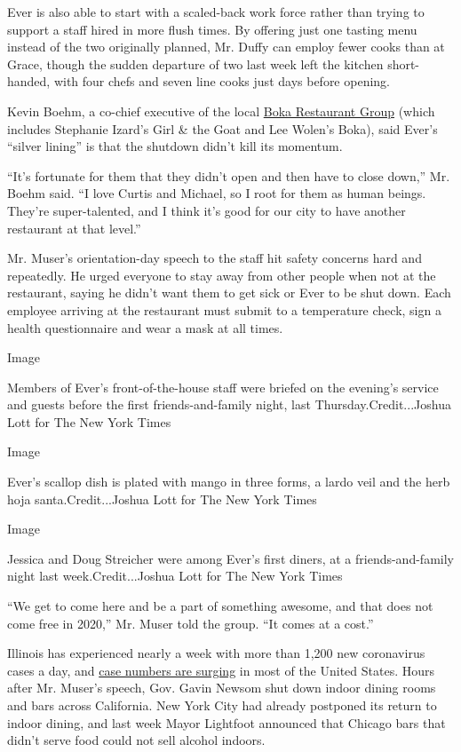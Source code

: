 Ever is also able to start with a scaled-back work force rather than
trying to support a staff hired in more flush times. By offering just
one tasting menu instead of the two originally planned, Mr. Duffy can
employ fewer cooks than at Grace, though the sudden departure of two
last week left the kitchen short-handed, with four chefs and seven line
cooks just days before opening.

Kevin Boehm, a co-chief executive of the local
\href{https://www.bokagrp.com/}{Boka Restaurant Group} (which includes
Stephanie Izard's Girl \& the Goat and Lee Wolen's Boka), said Ever's
``silver lining'' is that the shutdown didn't kill its momentum.

``It's fortunate for them that they didn't open and then have to close
down,'' Mr. Boehm said. ``I love Curtis and Michael, so I root for them
as human beings. They're super-talented, and I think it's good for our
city to have another restaurant at that level.''

Mr. Muser's orientation-day speech to the staff hit safety concerns hard
and repeatedly. He urged everyone to stay away from other people when
not at the restaurant, saying he didn't want them to get sick or Ever to
be shut down. Each employee arriving at the restaurant must submit to a
temperature check, sign a health questionnaire and wear a mask at all
times.

Image

Members of Ever's front-of-the-house staff were briefed on the evening's
service and guests before the first friends-and-family night, last
Thursday.Credit...Joshua Lott for The New York Times

Image

Ever's scallop dish is plated with mango in three forms, a lardo veil
and the herb hoja santa.Credit...Joshua Lott for The New York Times

Image

Jessica and Doug Streicher were among Ever's first diners, at a
friends-and-family night last week.Credit...Joshua Lott for The New York
Times

``We get to come here and be a part of something awesome, and that does
not come free in 2020,'' Mr. Muser told the group. ``It comes at a
cost.''

Illinois has experienced nearly a week with more than 1,200 new
coronavirus cases a day, and
\href{https://slack-redir.net/link?url=https\%3A\%2F\%2Fwww.nytimes.com\%2Finteractive\%2F2020\%2Fus\%2Fcoronavirus-us-cases.html\%23states}{case
numbers are surging} in most of the United States. Hours after Mr.
Muser's speech, Gov. Gavin Newsom shut down indoor dining rooms and bars
across California. New York City had already postponed its return to
indoor dining, and last week Mayor Lightfoot announced that Chicago bars
that didn't serve food could not sell alcohol indoors.


